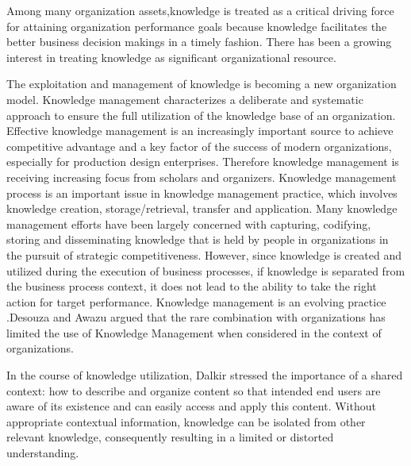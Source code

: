 \documentclass{elsarticle}
\begin{document}
\textrm{Among many organization assets,}\textrm{knowledge}\textrm{{ }}\textrm{is treated as a
critical driving force for attaining organization performance goals
because knowledge facilitates the better business decision makings in a
timely fashion\cite{han2009process}. There has been a growing interest in treating
knowledge as significant organizational resource\cite{alavi2001review}}.


The exploitation and management of
 knowledge  is becoming a new organization
model\cite{vandaie2008role}. Knowledge management characterizes a deliberate and
systematic approach to ensure the full utilization of the knowledge
base of an organization. Effective knowledge management is an
increasingly important source to achieve competitive advantage and a
key factor of the
success of modern organizations\cite{becerra2001organizational}, especially for production design
enterprises. Therefore knowledge management is receiving increasing
focus from scholars and organizers. Knowledge management process is an
important issue in knowledge management practice, which involves
knowledge creation, storage/retrieval, transfer and application.
Many knowledge management efforts
have been largely concerned with capturing, codifying,
storing and disseminating knowledge that is held by people in
organizations in the pursuit of strategic competitiveness. However,
since knowledge is created and utilized during the execution of
business processes, if knowledge is separated from the business process
context, it does not lead to the ability to take the right action for
target performance. Knowledge management is an evolving practice
\cite{davenport1998working}.\textrm{Desouza and
Awazu argued that the rare combination with organizations has limited
the use of Knowledge Management when considered in the context of
organizations\cite{desouza2003barriers,desouza2006four}. }


\textrm{In the course of knowledge utilization, Dalkir  stressed
the importance of a shared context: how to describe and organize
content so that intended end users are aware of its existence and can
easily access and apply this content\cite{dalkir2005knowledge}. Without appropriate contextual
information, }\textrm{knowledge can be isolated from other relevant
knowledge, consequently resulting in a limited or distorted
understanding\cite{ahn2005utilizing}.}
\end{document}
